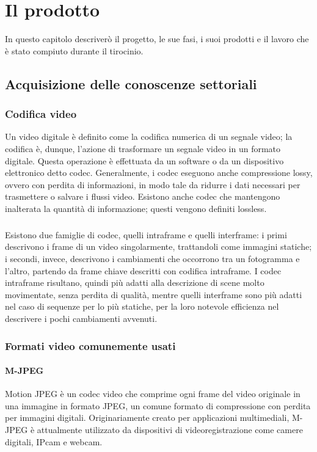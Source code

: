 \chapter{Il prodotto\label{cap:ilprodotto}}
In questo capitolo descriverò il progetto, le sue fasi, i suoi prodotti e il lavoro che è stato compiuto durante il tirocinio.

\section{Acquisizione delle conoscenze settoriali}
	\subsection{Codifica video}
	Un video digitale è definito come la codifica numerica di un segnale video; la codifica è, dunque, l'azione di trasformare un segnale video in un formato digitale. Questa operazione è effettuata da un software o da un dispositivo elettronico detto codec. Generalmente, i codec eseguono anche compressione lossy, ovvero con perdita di informazioni, in modo tale da ridurre i dati necessari per trasmettere o salvare i flussi video. Esistono anche codec che mantengono inalterata la quantità di informazione; questi vengono definiti lossless.
	\paragraph*{}
	Esistono due famiglie di codec, quelli intraframe e quelli interframe:
	i primi descrivono i frame di un video singolarmente, trattandoli come immagini statiche; i secondi, invece, descrivono i cambiamenti che occorrono tra un fotogramma e l'altro, partendo da frame chiave descritti con codifica intraframe. I codec intraframe risultano, quindi più adatti alla descrizione di scene molto movimentate, senza perdita di qualità, mentre quelli interframe sono più adatti nel caso di sequenze per lo più statiche, per la loro notevole efficienza nel descrivere i pochi cambiamenti avvenuti.

	\subsection{Formati video comunemente usati}
		\subsubsection{M-JPEG}
			Motion \gls{JPEG}	è un codec video che comprime ogni frame del video originale in una immagine in formato \gls{JPEG}, un comune formato di compressione con perdita per immagini digitali. Originariamente creato per applicazioni multimediali, M-JPEG è attualmente utilizzato da dispositivi di videoregistrazione come camere digitali, IPcam e webcam.
